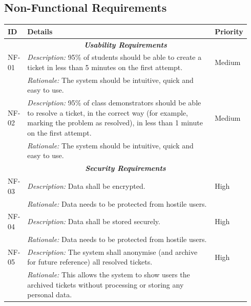 \subsection{Non-Functional Requirements}

\begin{table}[H]
\small
\begin{tabular}{|p{0.07\linewidth} | p{0.78\linewidth} |p{0.09\linewidth}|}
 \hline
 \textbf{ID} & \textbf{Details} & \textbf{Priority} \\
 
 \hline
   \multicolumn{3}{c}{\textit{\textbf{Usability Requirements}}}\\
 \hline
 
   NF-01 & \textit{Description:} 95\% of students should be able to create a ticket in less than 5 minutes on the first attempt. & Medium \\
  \cline{2-2}
  & \textit{Rationale:} The system should be intuitive, quick and easy to use. & \\

   \hline\hline
      NF-02 & \textit{Description:} 95\% of class demonstrators should be able to resolve a ticket, in the correct way (for example, marking the problem as resolved), in less than 1 minute on the first attempt. & Medium \\
  \cline{2-2}
  & \textit{Rationale:} The system should be intuitive, quick and easy to use. & \\
   \hline
     
     \multicolumn{3}{c}{\textit{\textbf{Security Requirements}}}\\
     
     \hline
 NF-03 & \textit{Description:} Data shall be encrypted. & High\\
  \cline{2-2}
  & \textit{Rationale:} Data needs to be protected from hostile users. & \\
  
    \hline\hline
 NF-04 & \textit{Description:} Data shall be stored securely. & High\\
  \cline{2-2}
  & \textit{Rationale:} Data needs to be protected from hostile users. & \\
  
      \hline\hline
 NF-05 & \textit{Description:} The system shall anonymise (and archive for future reference) all resolved tickets. & High\\
  \cline{2-2}
  & \textit{Rationale:} This allows the system to show users the archived tickets without processing or storing any personal data. & \\
  

\end{tabular}
\end{table}
